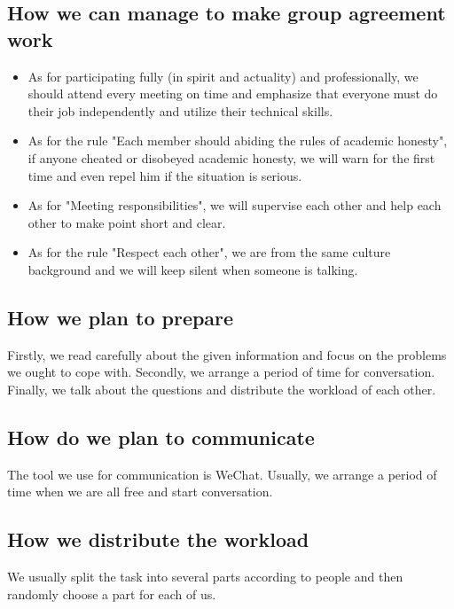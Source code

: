 \subsection{How we can manage to make group agreement work}
\begin{itemize}
    \item As for participating fully (in spirit and actuality) and professionally, we should attend every meeting on time and emphasize that everyone must do their job independently and utilize their technical skills.
    \item As for the rule "Each member should abiding the rules of academic honesty", if anyone cheated or disobeyed academic honesty, we will warn for the first time and even repel him if the situation is serious.
    \item As for "Meeting responsibilities", we will supervise each other and help each other to make point short and clear.
    \item As for the rule "Respect each other", we are from the same culture background and we will keep silent when someone is talking.
\end{itemize}
\subsection{How we plan to prepare}
Firstly, we read carefully about the given information and  focus on the problems we ought to cope with. Secondly, we arrange a period of time for conversation. Finally, we talk about the questions and distribute the workload of each other.
\subsection{How do we plan to communicate}
The tool we use for communication is WeChat. Usually, we arrange a period of time when we are all free and start conversation. 
\subsection{How we distribute the workload}
We usually split the task into several parts according to people and then randomly choose a part for each of us.
